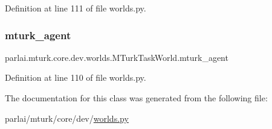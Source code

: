 Definition at line 111 of file worlds.\+py.

\mbox{\label{classparlai_1_1mturk_1_1core_1_1dev_1_1worlds_1_1MTurkTaskWorld_ac57f970ab26bb0526c73c03c1b8cad70}} 
\subsubsection{\texorpdfstring{mturk\+\_\+agent}{mturk\_agent}}
{\footnotesize\ttfamily parlai.\+mturk.\+core.\+dev.\+worlds.\+M\+Turk\+Task\+World.\+mturk\+\_\+agent}



Definition at line 110 of file worlds.\+py.



The documentation for this class was generated from the following file\+:\begin{DoxyCompactItemize}
\item 
parlai/mturk/core/dev/\hyperlink{parlai_2mturk_2core_2dev_2worlds_8py}{worlds.\+py}\end{DoxyCompactItemize}
